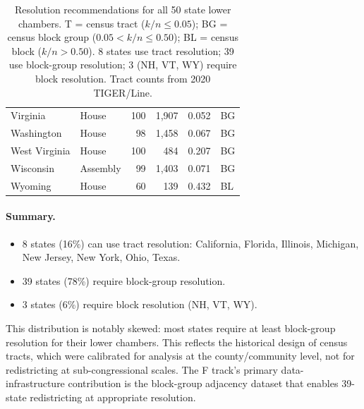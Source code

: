 \begin{table}[h]
\begin{tabular}{llrrrl}
Virginia     & House        & 100 & 1{,}907 & 0.052 & BG \\
Washington   & House        & 98  & 1{,}458 & 0.067 & BG \\
West Virginia & House       & 100 & 484   & 0.207 & BG \\
Wisconsin    & Assembly     & 99  & 1{,}403 & 0.071 & BG \\
Wyoming      & House        & 60  & 139   & 0.432 & BL \\
\bottomrule
\end{tabular}
\caption{Resolution recommendations for all 50 state lower chambers.
  T = census tract ($k/n \leq 0.05$); BG = census block group ($0.05 < k/n \leq 0.50$);
  BL = census block ($k/n > 0.50$). 8 states use tract resolution; 39 use
  block-group resolution; 3 (NH, VT, WY) require block resolution.
  Tract counts from 2020 TIGER/Line.}
\label{tab:recommendation}
\end{table}

\paragraph{Summary.}
\begin{itemize}
  \item 8 states (16\%) can use tract resolution: California, Florida, Illinois,
    Michigan, New Jersey, New York, Ohio, Texas.
  \item 39 states (78\%) require block-group resolution.
  \item 3 states (6\%) require block resolution (NH, VT, WY).
\end{itemize}

This distribution is notably skewed: most states require at least block-group
resolution for their lower chambers. This reflects the historical design of
census tracts, which were calibrated for analysis at the county/community
level, not for redistricting at sub-congressional scales. The F track's
primary data-infrastructure contribution is the block-group adjacency dataset
that enables 39-state redistricting at appropriate resolution.
